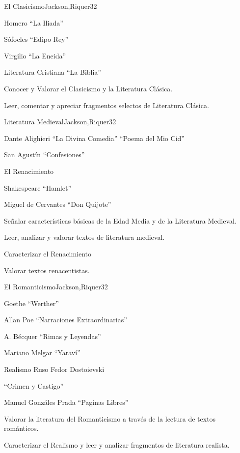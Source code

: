 \begin{syllabus}
\begin{unit}{El Clasicismo}{Jackson,Riquer}{3}{2}
\begin{topics}
	\item Homero ``La Iliada''
	\item Sófocles ``Edipo Rey''
	\item Virgilio ``La Eneida''
	\item Literatura Cristiana ``La Biblia''
\end{topics}
\begin{learningoutcomes}
	\item Conocer y Valorar el Clasicismo y la Literatura Clásica.
	\item Leer, comentar y apreciar fragmentos selectos de Literatura Clásica.
\end{learningoutcomes}
\end{unit}
\begin{unit}{Literatura Medieval}{Jackson,Riquer}{3}{2}
\begin{topics}
	\item Dante Alighieri ``La Divina Comedia'' ``Poema del Mio Cid''
	\item    San Agustín ``Confesiones''  
	\item    El Renacimiento
	\item    Shakespeare ``Hamlet''
	\item    Miguel de Cervantes ``Don Quijote''
\end{topics}
\begin{learningoutcomes}
	\item Señalar características básicas de la Edad Media y de la Literatura Medieval.
	\item Leer, analizar y valorar textos de literatura medieval.
	\item Caracterizar el Renacimiento
	\item Valorar textos renacentistas.
\end{learningoutcomes}
\end{unit}

\begin{unit}{El Romanticismo}{Jackson,Riquer}{3}{2}
\begin{topics}
	\item Goethe ``Werther''
	\item Allan Poe ``Narraciones Extraordinarias''
	\item A. Bécquer ``Rimas y Leyendas''
	\item Mariano Melgar ``Yaraví''
	\item Realismo Ruso Fedor Dostoievski 
	\item ``Crimen y Castigo''
	\item Manuel Gonzáles Prada ``Paginas Libres''
\end{topics}
\begin{learningoutcomes}
	\item Valorar la literatura del Romanticismo a través de la lectura de textos románticos.
	\item Caracterizar el Realismo y leer y analizar fragmentos de literatura realista.
\end{learningoutcomes}
\end{unit}


\end{syllabus}
